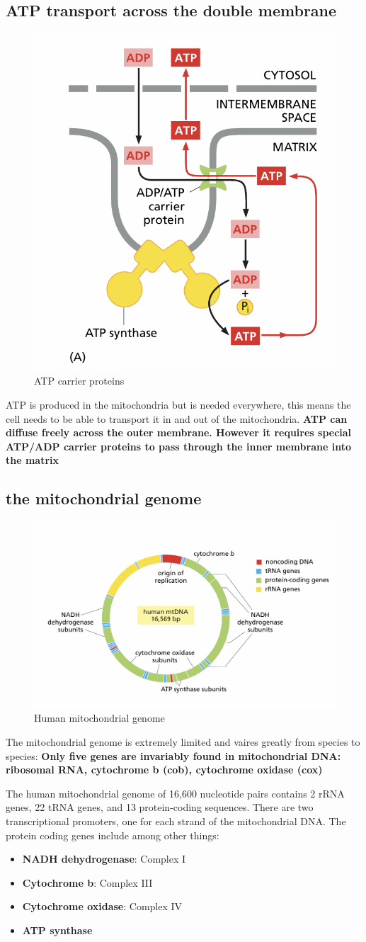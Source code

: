 \documentclass[../main.tex]{subfiles}
\begin{document}
\subsection{ATP transport across the double membrane}
\begin{figure}[H]
    \centering
    \includegraphics[width=0.4\linewidth]{ATPtransport.png}
    \caption{ATP carrier proteins}
    \label{fig:enter-label}
\end{figure}
ATP is produced in the mitochondria but is needed everywhere, this means the cell needs to be able to transport it in and out of the mitochondria. \textbf{ATP can diffuse freely across the outer membrane. However it requires special ATP/ADP carrier proteins to pass through the inner membrane into the matrix}
\subsection{the mitochondrial genome}
\begin{figure}[H]
    \centering
    \includegraphics[width=0.5\linewidth]{mtGenome.png}
    \caption{Human mitochondrial genome}
    \label{fig:enter-label}
\end{figure}
The mitochondrial genome is extremely limited and vaires greatly from species to species:  \textbf{Only five genes are invariably found in mitochondrial DNA: ribosomal RNA, cytochrome b (cob), cytochrome oxidase (cox)} 
\par
The human mitochondrial genome of 16,600 
nucleotide pairs contains 2 rRNA genes, 
22 tRNA genes, and 13 protein-coding 
sequences. There are two transcriptional 
promoters, one for each strand of the 
mitochondrial DNA. The protein coding genes include among other things:
\begin{itemize}
    \item \textbf{NADH dehydrogenase}: Complex I
    \item \textbf{Cytochrome b}: Complex III
    \item \textbf{Cytochrome oxidase}: Complex IV
    \item \textbf{ATP synthase}
\end{itemize}
\end{document}
